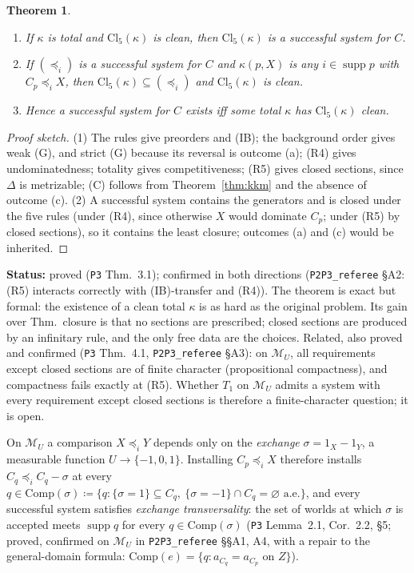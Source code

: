 \documentclass[11pt]{article}
\newtheorem{theorem}{Theorem}[section]
\theoremstyle{definition}
\theoremstyle{remark}
\newcommand{\M}{\mathcal M}
\newcommand{\supp}{\operatorname{supp}}
\newcommand{\src}[1]{\texttt{#1}}
\newcommand{\status}[1]{\par\smallskip\noindent\textbf{Status:} #1\par\smallskip}
\begin{document}
\begin{theorem}\label{thm:R5}
\begin{enumerate}[leftmargin=*,label=(\arabic*)]
\item If $\kappa$ is total and $\mathrm{Cl}_5(\kappa)$ is clean, then $\mathrm{Cl}_5(\kappa)$ is a successful system for $C$.
\item If $(\preceq_i)$ is a successful system for $C$ and $\kappa(p,X)$ is any $i\in\supp p$ with $C_p\preceq_iX$, then $\mathrm{Cl}_5(\kappa)\subseteq(\preceq_i)$ and $\mathrm{Cl}_5(\kappa)$ is clean.
\item Hence a successful system for $C$ exists iff some total $\kappa$ has $\mathrm{Cl}_5(\kappa)$ clean.
\end{enumerate}
\end{theorem}
\begin{proof}[Proof sketch]
(1) The rules give preorders and (IB); the background order gives weak (G), and strict (G) because its reversal is outcome (a); (R4) gives undominatedness; totality gives competitiveness; (R5) gives closed sections, since $\Delta$ is metrizable; (C) follows from Theorem~\ref{thm:kkm} and the absence of outcome (c). (2) A successful system contains the generators and is closed under the five rules (under (R4), since otherwise $X$ would dominate $C_p$; under (R5) by closed sections), so it contains the least closure; outcomes (a) and (c) would be inherited.
\end{proof}
\status{proved (\src{P3} Thm.~3.1); confirmed in both directions (\src{P2P3\_referee} \S A2: (R5) interacts correctly with (IB)-transfer and (R4)). The theorem is exact but formal: the existence of a clean total $\kappa$ is as hard as the original problem. Its gain over Thm.~closure is that no sections are prescribed; closed sections are produced by an infinitary rule, and the only free data are the choices. Related, also proved and confirmed (\src{P3} Thm.~4.1, \src{P2P3\_referee} \S A3): on $\M_U$, all requirements except closed sections are of finite character (propositional compactness), and compactness fails exactly at (R5). Whether $T_1$ on $\M_U$ admits a system with every requirement except closed sections is therefore a finite-character question; it is open.}

On $\M_U$ a comparison $X\preceq_iY$ depends only on the \emph{exchange} $\sigma=1_X-1_Y$, a measurable function $U\to\{-1,0,1\}$. Installing $C_p\preceq_iX$ therefore installs $C_q\preceq_iC_q-\sigma$ at every $q\in\mathrm{Comp}(\sigma)\coloneqq\{q:\{\sigma=1\}\subseteq C_q,\ \{\sigma=-1\}\cap C_q=\varnothing\text{ a.e.}\}$, and every successful system satisfies \emph{exchange transversality}: the set of worlds at which $\sigma$ is accepted meets $\supp q$ for every $q\in\mathrm{Comp}(\sigma)$ (\src{P3} Lemma~2.1, Cor.~2.2, \S5; proved, confirmed on $\M_U$ in \src{P2P3\_referee} \S\S A1, A4, with a repair to the general-domain formula: $\mathrm{Comp}(e)=\{q:a_{C_q}=a_{C_p}\text{ on }Z\}$).
\end{document}
